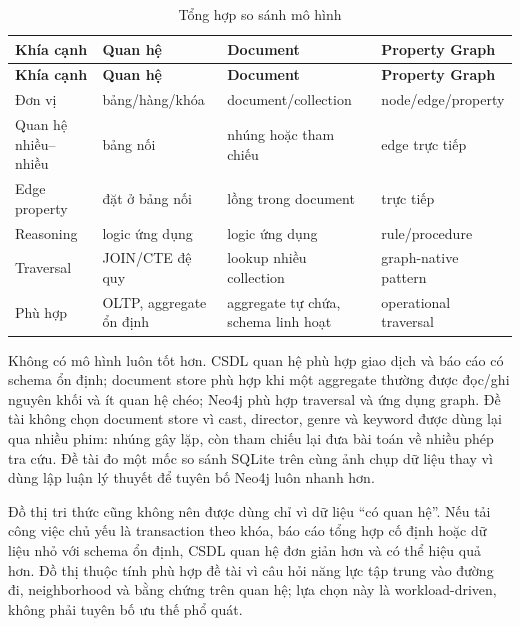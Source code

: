 \begin{longtable}{|>{\raggedright\arraybackslash}p{}|>{\raggedright\arraybackslash}p{}|>{\raggedright\arraybackslash}p{}|>{\raggedright\arraybackslash}p{}|}
\caption{Tổng hợp so sánh mô hình}\label{tab:1-2} \\
\hline
\textbf{Khía cạnh} & \textbf{Quan hệ} & \textbf{Document} & \textbf{Property Graph} \\ \hline
\endfirsthead\hline \textbf{Khía cạnh} & \textbf{Quan hệ} & \textbf{Document} & \textbf{Property Graph} \\ \hline\endhead
Đơn vị & bảng/hàng/khóa & document/collection & node/edge/property \\ \hline
Quan hệ nhiều–nhiều & bảng nối & nhúng hoặc tham chiếu & edge trực tiếp \\ \hline
Edge property & đặt ở bảng nối & lồng trong document & trực tiếp \\ \hline
Reasoning & logic ứng dụng & logic ứng dụng & rule/procedure \\ \hline
Traversal & JOIN/CTE đệ quy & lookup nhiều collection & graph-native pattern \\ \hline
Phù hợp & OLTP, aggregate ổn định & aggregate tự chứa, schema linh hoạt & operational traversal \\ \hline
\end{longtable}

Không có mô hình luôn tốt hơn. CSDL quan hệ phù hợp giao dịch và báo cáo có
schema ổn định; document store phù hợp khi một aggregate thường được đọc/ghi
nguyên khối và ít quan hệ chéo; Neo4j phù
hợp traversal và ứng dụng graph. Đề tài không chọn document store vì cast,
director, genre và keyword được dùng lại qua nhiều phim: nhúng gây lặp, còn tham
chiếu lại đưa bài toán về nhiều phép tra cứu. Đề tài đo một mốc so sánh SQLite
trên cùng ảnh chụp dữ liệu thay vì dùng
lập luận lý thuyết để tuyên bố Neo4j luôn nhanh hơn.

Đồ thị tri thức cũng không nên được dùng chỉ vì dữ liệu “có quan hệ”. Nếu tải công việc
chủ yếu là transaction theo khóa, báo cáo tổng hợp cố định hoặc dữ liệu nhỏ với
schema ổn định, CSDL quan hệ đơn giản hơn và có thể hiệu quả hơn. Đồ thị thuộc
tính phù hợp đề tài vì câu hỏi năng lực tập trung vào đường
đi, neighborhood và bằng chứng trên quan hệ; lựa chọn này là workload-driven,
không phải tuyên bố ưu thế phổ quát.

